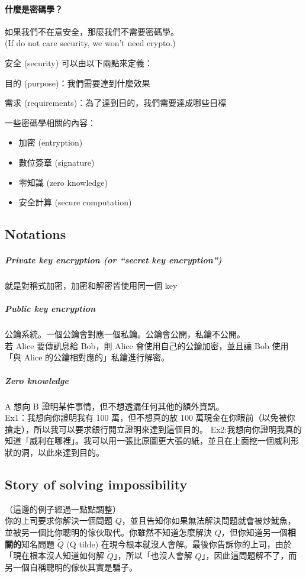 \paragraph{什麼是密碼學？}

如果我們不在意安全，那麼我們不需要密碼學。 \\
(If do not care security, we won't need crypto.)

安全 (security) 可以由以下兩點來定義：
\begin{myItemize}
	\item 目的 (purpose)：我們需要達到什麼效果
	\item 需求 (requirements)：為了達到目的，我們需要達成哪些目標
\end{myItemize}

一些密碼學相關的內容：
\begin{itemize}
	\item 加密 (entryption)
	\item 數位簽章 (signature)
	\item 零知識 (zero knowledge)
	\item 安全計算 (secure computation)
\end{itemize}


\subsection{Notations}

\subparagraph{Private key encryption (or “secret key encryption”)}
就是對稱式加密，加密和解密皆使用同一個 key

\subparagraph{Public key encryption}
公鑰系統。一個公鑰會對應一個私鑰。公鑰會公開，私鑰不公開。 \\
若 Alice 要傳訊息給 Bob，則 Alice 會使用自己的公鑰加密，並且讓 Bob 使用「與 Alice 的公鑰相對應的」私鑰進行解密。

\subparagraph{Zero knowledge}
A 想向 B 證明某件事情，但不想透漏任何其他的額外資訊。 \\
Ex1：我想向你證明我有 100 萬，但不想真的放 100 萬現金在你眼前（以免被你搶走），所以我可以要求銀行開立證明來達到這個目的。
Ex2:我想向你證明我真的知道「威利在哪裡」。我可以用一張比原圖更大張的紙，並且在上面挖一個威利形狀的洞，以此來達到目的。


\subsection{Story of solving impossibility}

（這邊的例子經過一點點調整） \\
你的上司要求你解決一個問題 \(Q\)，並且告知你如果無法解決問題就會被炒魷魚，並被另一個比你聰明的傢伙取代。你雖然不知道怎麼解決 \(Q\)，但你知道另一個\textbf{相關的}知名問題 \(\widetilde{Q}\) (Q tilde) 在現今根本就沒人會解。最後你告訴你的上司，由於「現在根本沒人知道如何解 \(\widetilde{Q}\)」，所以「也沒人會解 \(Q\)」，因此這問題解不了，而另一個自稱聰明的傢伙其實是騙子。


